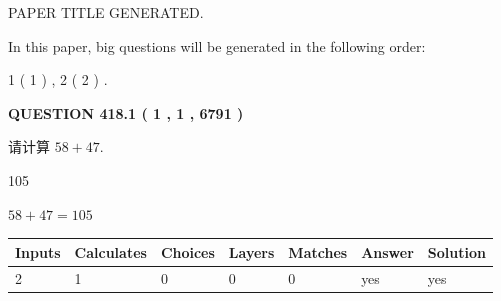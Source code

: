 \documentclass{ctexart}
\begin{document}
   
 \vspace{0.2in}
 
 
 
 
   
   
 PAPER TITLE GENERATED.
   
   
   
\vspace{0.2in}
   
In this paper, big questions will be generated in the following order: 
   
   
   1 ( 1 )
 ,
   2 ( 2 )
 .
  
\vspace{0.2in}
  
{\textbf{\Large{QUESTION
418.1 
 ( 1 , 1 , 6791 )
}}}
  
  
 
请计算 $ %
58 +  %
47 $.
 
 
 
\noindent{}
 
 

105
 
 
\noindent{}
 
 

 
 
 
\noindent{}
 
 

$ %
58 +  %
47=   %
105$
 
 
\noindent{}
 
 

 
   
   
   
   
\noindent\begin{tabular}{|l|l|l|l|l|l|l|}
 \hline
Inputs & Calculates & Choices & Layers & Matches & Answer & Solution \\ \hline
 2  & 
 1  & 
 0
  & 
 0  & 
 0  & 
  yes & 
  yes 
  \\ \hline
 \end{tabular}
   
   
   
   
\noindent{}
   
   
  
\end{document}
